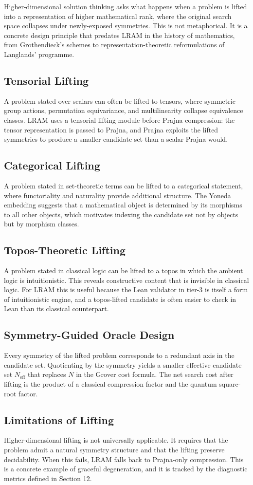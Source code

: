 Higher-dimensional solution thinking asks what happens when a problem is lifted into a representation of higher mathematical rank, where the original search space collapses under newly-exposed symmetries. This is not metaphorical. It is a concrete design principle that predates LRAM in the history of mathematics, from Grothendieck's schemes to representation-theoretic reformulations of Langlands' programme.

\subsection{Tensorial Lifting}
A problem stated over scalars can often be lifted to tensors, where symmetric group actions, permutation equivariance, and multilinearity collapse equivalence classes. LRAM uses a tensorial lifting module before Prajna compression: the tensor representation is passed to Prajna, and Prajna exploits the lifted symmetries to produce a smaller candidate set than a scalar Prajna would.

\subsection{Categorical Lifting}
A problem stated in set-theoretic terms can be lifted to a categorical statement, where functoriality and naturality provide additional structure. The Yoneda embedding suggests that a mathematical object is determined by its morphisms to all other objects, which motivates indexing the candidate set not by objects but by morphism classes.

\subsection{Topos-Theoretic Lifting}
A problem stated in classical logic can be lifted to a topos in which the ambient logic is intuitionistic. This reveals constructive content that is invisible in classical logic. For LRAM this is useful because the Lean validator in tier-3 is itself a form of intuitionistic engine, and a topos-lifted candidate is often easier to check in Lean than its classical counterpart.

\subsection{Symmetry-Guided Oracle Design}
Every symmetry of the lifted problem corresponds to a redundant axis in the candidate set. Quotienting by the symmetry yields a smaller effective candidate set $N_{\mathrm{eff}}$ that replaces $N$ in the Grover cost formula. The net search cost after lifting is the product of a classical compression factor and the quantum square-root factor.

\subsection{Limitations of Lifting}
Higher-dimensional lifting is not universally applicable. It requires that the problem admit a natural symmetry structure and that the lifting preserve decidability. When this fails, LRAM falls back to Prajna-only compression. This is a concrete example of graceful degeneration, and it is tracked by the diagnostic metrics defined in Section 12.
